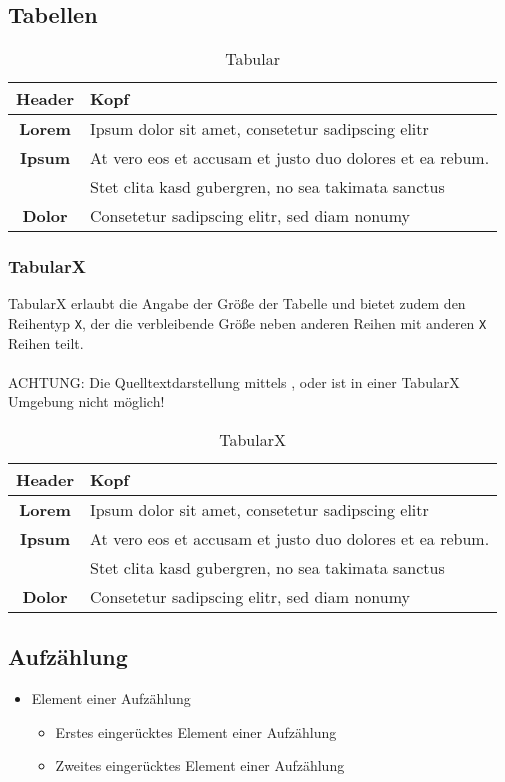 \subsection{Tabellen}
\begin{table}[H]
	\center
	\begin{tabular}{| c | l |}
		\hline Header & Kopf\\ \hline\hline
		\textbf{Lorem} & Ipsum dolor sit amet, consetetur sadipscing elitr\\ \hline
		\textbf{Ipsum} & At vero eos et accusam et justo duo dolores et ea rebum.\\
			& Stet clita kasd gubergren, no sea takimata sanctus\\ \hline
		\textbf{Dolor} & Consetetur sadipscing elitr, sed diam nonumy\\\hline
	\end{tabular}
	\caption{Tabular}
	\label{tab:tabular}
\end{table}

\subsubsection{TabularX}
TabularX erlaubt die Angabe der Größe der Tabelle und bietet zudem den Reihentyp \texttt{X}, der die verbleibende Größe neben anderen Reihen mit anderen \texttt{X} Reihen teilt.
\\\\
ACHTUNG: Die Quelltextdarstellung mittels ,  oder  ist in einer TabularX Umgebung nicht möglich!
\begin{table}[H]
    \center
    \begin{tabularx}{\textwidth}{| c | X |}
        \hline Header & Kopf\\ \hline\hline
        \textbf{Lorem} & Ipsum dolor sit amet, consetetur sadipscing elitr\\ \hline
        \textbf{Ipsum} & At vero eos et accusam et justo duo dolores et ea rebum.\\
            & Stet clita kasd gubergren, no sea takimata sanctus\\ \hline
        \textbf{Dolor} & Consetetur sadipscing elitr, sed diam nonumy\\\hline
    \end{tabularx}
    \caption{TabularX}
    \label{tab:tabularx}
\end{table}

\newpage
\subsection{Aufzählung}
\begin{itemize}
	\item Element einer Aufzählung
	\begin{itemize}
        \item Erstes eingerücktes Element einer Aufzählung
        \item Zweites eingerücktes Element einer Aufzählung
    \end{itemize}
\end{itemize}

